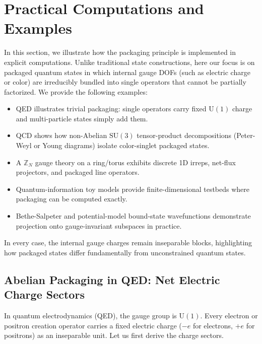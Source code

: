 \documentclass[12pt,a4paper]{article}
\begin{document}
\section{Practical Computations and Examples}
\label{SEC:PracticalComputationsAndExamples}


In this section, we illustrate how the packaging principle is implemented in explicit computations.
Unlike traditional state constructions, here our focus is on packaged quantum states in which internal gauge DOFs (such as electric charge or color) are irreducibly bundled into single operators that cannot be partially factorized.
We provide the following examples:
\begin{itemize}
	\item QED illustrates trivial packaging: single operators carry fixed $\mathrm{U}(1)$ charge and multi-particle states simply add them.
	
	\item QCD shows how non-Abelian $\mathrm{SU}(3)$ tensor-product decompositions (Peter-Weyl or Young diagrams) isolate color-singlet packaged states.
	
	\item A $\mathbb Z_N$ gauge theory on a ring/torus exhibits discrete 1D irreps, net-flux projectors, and packaged line operators.
	
	\item Quantum-information toy models provide finite-dimensional testbeds where packaging can be computed exactly.
	
	\item Bethe-Salpeter and potential-model bound-state wavefunctions demonstrate projection onto gauge-invariant subspaces in practice.
\end{itemize}
In every case, the internal gauge charges remain inseparable blocks, highlighting how packaged states differ fundamentally from unconstrained quantum states.



\subsection{Abelian Packaging in QED: Net Electric Charge Sectors}

In quantum electrodynamics (QED), the gauge group is $\mathrm{U}(1)$. Every electron or positron creation operator carries a fixed electric charge ($-e$ for electrons, $+e$ for positrons) as an inseparable unit.
Let us first derive the charge sectors.
\end{document}
